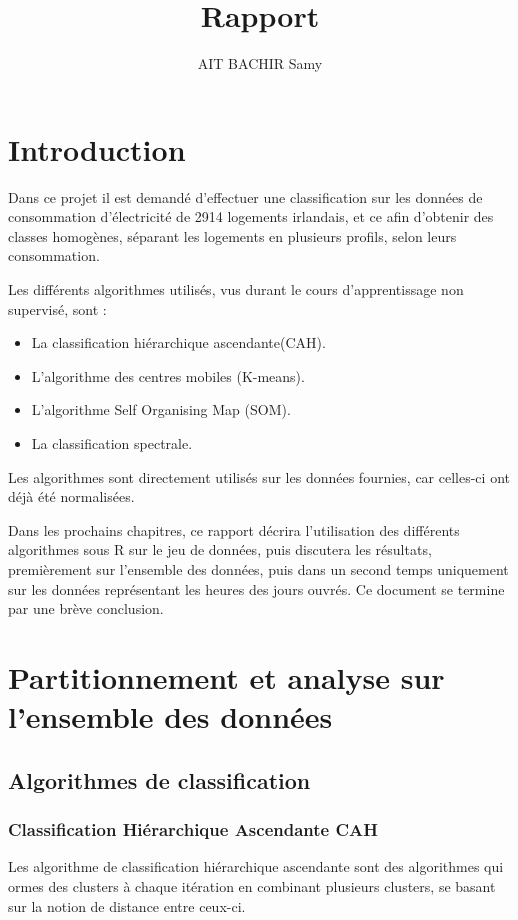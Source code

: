 \documentclass[a4paper,titlepage,12pt]{report}
\title{Rapport}
\author{AIT BACHIR Samy}
\begin{document}
\chapter{Introduction}
	Dans ce projet il est demandé d'effectuer une classification sur les données de consommation d'électricité de 2914 logements irlandais, et ce afin d'obtenir des classes homogènes, séparant les logements en plusieurs profils, selon leurs consommation.\newline
	
	Les différents algorithmes utilisés, vus durant le cours d'apprentissage non supervisé, sont :
	\begin{itemize}
		\item La classification hiérarchique ascendante(CAH).
		\item L'algorithme des centres mobiles (K-means).
		\item L'algorithme Self Organising Map (SOM).
		\item La classification spectrale.
	\end{itemize}
	
	Les algorithmes sont directement utilisés sur les données fournies, car celles-ci ont déjà été normalisées.\newline
	
	Dans les prochains chapitres, ce rapport décrira l'utilisation des différents algorithmes sous R sur le jeu de données, puis discutera les résultats, premièrement sur l'ensemble des données, puis dans un second temps uniquement sur les données représentant les heures des jours ouvrés. Ce document se termine par une brève conclusion. 
	 
\chapter{Partitionnement et analyse sur l'ensemble des données}
	\section{Algorithmes de classification}
		\subsection{Classification Hiérarchique Ascendante CAH}
			Les algorithme de classification hiérarchique ascendante sont des algorithmes qui ormes des clusters à chaque itération en combinant plusieurs clusters, se basant sur la notion de distance entre ceux-ci.
			
\end{document}
